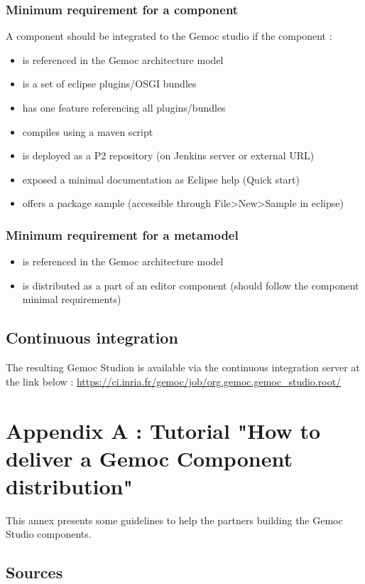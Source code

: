 \documentclass{gemoc} %
\begin{document}
\subsection{Minimum requirement for a component}
A component should be integrated to the Gemoc studio if the component :
\begin{itemize}
	\item is referenced in the Gemoc architecture model
	\item is a set of eclipse plugins/OSGI bundles
	\item has one feature referencing all plugins/bundles
	\item compiles using a maven script
	\item is deployed as a P2 repository (on Jenkins server or external URL)
	\item exposed a minimal documentation as Eclipse help (Quick start)
	\item offers a package sample (accessible through File>New>Sample in eclipse)
\end{itemize}
\subsection{Minimum requirement for a metamodel}
\begin{itemize}
	\item is referenced in the Gemoc architecture model
	\item is distributed as a part of an editor component (should follow the component minimal requirements)
\end{itemize}
\section{Continuous integration}
The resulting Gemoc Studion is available via the continuous integration server at the link below :
\newline
\url {https://ci.inria.fr/gemoc/job/org.gemoc.gemoc_studio.root/}


\newpage
\chapter{Appendix A : Tutorial "How to deliver a Gemoc Component distribution"}
This annex presents some guidelines to help the partners building the Gemoc Studio components.
\section{Sources}
\end{document}
